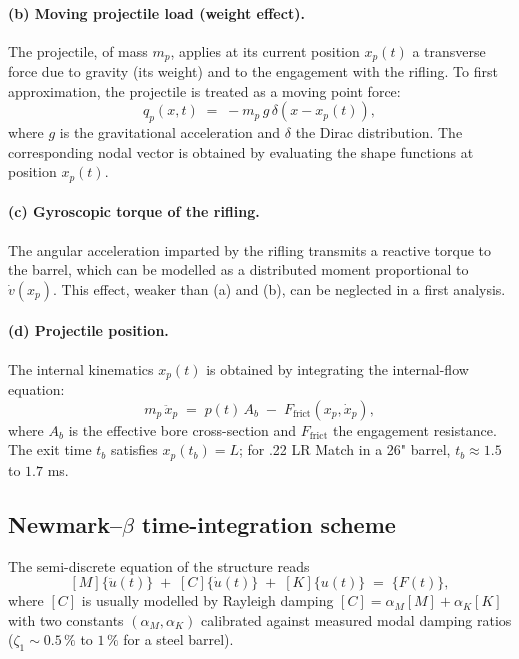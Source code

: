 \documentclass[12pt,a4paper]{article}
\begin{document}
	\paragraph{(b) Moving projectile load (weight effect).} The projectile, of mass $m_p$, applies at its current position $x_p(t)$ a transverse force due to gravity (its weight) and to the engagement with the rifling. To first approximation, the projectile is treated as a moving point force:
	\begin{equation}
		q_p(x,t) \;=\; -m_p\,g\,\delta(x - x_p(t)),
	\end{equation}
	where $g$ is the gravitational acceleration and $\delta$ the Dirac distribution. The corresponding nodal vector is obtained by evaluating the shape functions at position $x_p(t)$.

	\paragraph{(c) Gyroscopic torque of the rifling.} The angular acceleration imparted by the rifling transmits a reactive torque to the barrel, which can be modelled as a distributed moment proportional to $\dot v(x_p)$. This effect, weaker than (a) and (b), can be neglected in a first analysis.

	\paragraph{(d) Projectile position.} The internal kinematics $x_p(t)$ is obtained by integrating the internal-flow equation:
	\begin{equation}
		m_p\,\ddot x_p \;=\; p(t)\, A_b \;-\; F_\text{frict}(x_p, \dot x_p),
	\end{equation}
	where $A_b$ is the effective bore cross-section and $F_\text{frict}$ the engagement resistance. The exit time $t_b$ satisfies $x_p(t_b) = L$; for .22 LR Match in a 26" barrel, $t_b \approx 1.5$ to $1.7$ ms.

	\subsection{Newmark--$\beta$ time-integration scheme}

	The semi-discrete equation of the structure reads
	\begin{equation}
		\label{eq:dynsemi}
		[M]\{\ddot u(t)\} \;+\; [C]\{\dot u(t)\} \;+\; [K]\{u(t)\} \;=\; \{F(t)\},
	\end{equation}
	where $[C]$ is usually modelled by Rayleigh damping $[C] = \alpha_M [M] + \alpha_K [K]$ with two constants $(\alpha_M,\alpha_K)$ calibrated against measured modal damping ratios ($\zeta_1 \sim 0.5\,\%$ to $1\,\%$ for a steel barrel).
\end{document}
